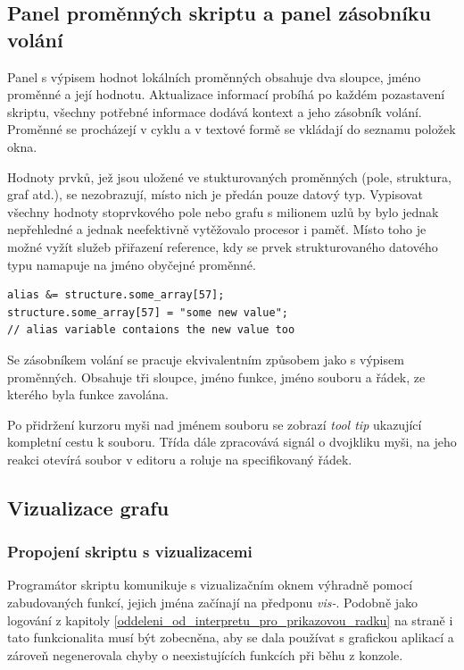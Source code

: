 \documentclass[11pt,twoside,a4paper]{book}
\begin{document}
\subsection{Panel proměnných skriptu a panel zásobníku volání}

Panel s výpisem hodnot lokálních proměnných obsahuje dva sloupce, jméno proměnné a její hodnotu. Aktualizace informací probíhá po každém pozastavení skriptu, všechny potřebné informace dodává kontext a jeho zásobník volání. Proměnné se procházejí v cyklu a v textové formě se vkládají do seznamu položek okna.

Hodnoty prvků, jež jsou uložené ve stukturovaných proměnných (pole, struktura, graf atd.), se nezobrazují, místo nich je předán pouze datový typ. Vypisovat všechny hodnoty stoprvkového pole nebo grafu s milionem uzlů by bylo jednak nepřehledné a jednak neefektivně vytěžovalo procesor i paměť. Místo toho je možné vyžít služeb přiřazení reference, kdy se prvek strukturovaného datového typu namapuje na jméno obyčejné proměnné.

\begin{verbatim}
alias &= structure.some_array[57];
structure.some_array[57] = "some new value";
// alias variable contaions the new value too
\end{verbatim}

Se zásobníkem volání se pracuje ekvivalentním způsobem jako s výpisem proměnných. Obsahuje tři sloupce, jméno funkce, jméno souboru a řádek, ze kterého byla funkce zavolána.

Po přidržení kurzoru myši nad jménem souboru se zobrazí \textit{tool tip} ukazující kompletní cestu k souboru. Třída dále zpracovává signál o dvojkliku myši, na jeho reakci otevírá soubor v editoru a roluje na specifikovaný řádek.


\subsection{Vizualizace grafu}

\subsubsection{Propojení skriptu s vizualizacemi}

Programátor skriptu komunikuje s vizualizačním oknem výhradně pomocí zabudovaných funkcí, jejich jména začínají na předponu \textit{vis-}. Podobně jako logování z kapitoly \ref{oddeleni_od_interpretu_pro_prikazovou_radku} na straně \pageref{oddeleni_od_interpretu_pro_prikazovou_radku} i tato funkcionalita musí být zobecněna, aby se dala používat s grafickou aplikací a zároveň negenerovala chyby o neexistujících funkcích při běhu z konzole.
\end{document}

